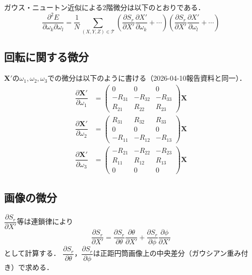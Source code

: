 \documentclass{ltjsarticle}          %
\begin{document}
ガウス・ニュートン近似による2階微分は以下のとおりである．
\begin{equation}
  \dfrac{\partial^2 E}{\partial \omega_k \partial \omega_l} = \dfrac{1}{N} \sum_{(X,Y,Z) \in \mathcal{T}}
  \left( \dfrac{\partial S_r}{\partial X'} \dfrac{\partial X'}{\partial \omega_k} + \cdots \right)
  \left( \dfrac{\partial S_r}{\partial X'} \dfrac{\partial X'}{\partial \omega_l} + \cdots \right)
  \label{eq:second_derivative}
\end{equation}

\subsection{回転に関する微分}
$\bm{X}'$の$\omega_1, \omega_2, \omega_3$での微分は以下のように書ける（2026-04-10報告資料と同一）．
\begin{align}
  \dfrac{\partial \bm{X}'}{\partial \omega_1} &=
  \begin{pmatrix}
    0 & 0 & 0 \\
    -R_{31} & -R_{32} & -R_{33} \\
    R_{21} & R_{22} & R_{23}
  \end{pmatrix}
  \bm{X}
  \label{eq:dX_domega1} \\
  \dfrac{\partial \bm{X}'}{\partial \omega_2} &=
  \begin{pmatrix}
    R_{31} & R_{32} & R_{33} \\
    0 & 0 & 0 \\
    -R_{11} & -R_{12} & -R_{13}
  \end{pmatrix}
  \bm{X}
  \label{eq:dX_domega2} \\
  \dfrac{\partial \bm{X}'}{\partial \omega_3} &=
  \begin{pmatrix}
    -R_{21} & -R_{22} & -R_{23} \\
    R_{11} & R_{12} & R_{13} \\
    0 & 0 & 0
  \end{pmatrix}
  \bm{X}
  \label{eq:dX_domega3}
\end{align}

\subsection{画像の微分}
$\dfrac{\partial S_r}{\partial X'}$等は連鎖律により
\begin{equation}
  \dfrac{\partial S_r}{\partial X'} = \dfrac{\partial S_r}{\partial \theta} \dfrac{\partial \theta}{\partial X'} + \dfrac{\partial S_r}{\partial \phi} \dfrac{\partial \phi}{\partial X'}
  \label{eq:chain_rule}
\end{equation}
として計算する．
$\dfrac{\partial S_r}{\partial \theta}$，$\dfrac{\partial S_r}{\partial \phi}$は正距円筒画像上の中央差分（ガウシアン重み付き）で求める．
\end{document}
